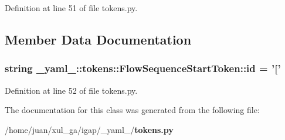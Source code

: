 Definition at line 51 of file tokens.py.

\subsection{Member Data Documentation}
\subsubsection{\setlength{\rightskip}{0pt plus 5cm}string {\bf \_\-yaml\_\-::tokens::FlowSequenceStartToken::id} = '['\hspace{0.3cm}{\tt  [static]}}\label{class__yaml___1_1tokens_1_1FlowSequenceStartToken_3a04aefa88a56fd02eb82455585a633d}




Definition at line 52 of file tokens.py.

The documentation for this class was generated from the following file:\begin{CompactItemize}
\item 
/home/juan/xul\_\-ga/igap/\_\-yaml\_\-/{\bf tokens.py}\end{CompactItemize}
